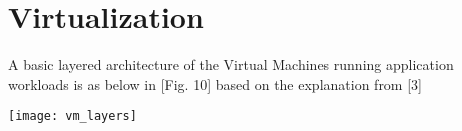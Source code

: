 \section{Virtualization}

A basic layered architecture of the Virtual Machines running application workloads is as below in [Fig. 10] based on the explanation from [3]
	
\texttt{[image: vm\_layers]}
